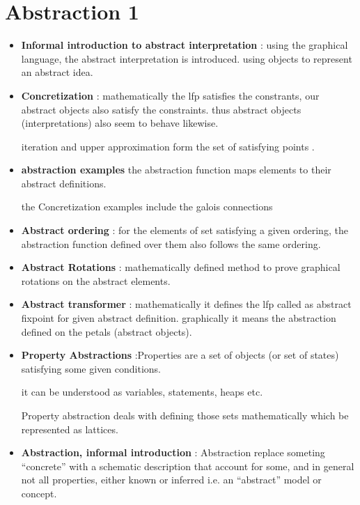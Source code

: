 \chapter{Abstraction 1}


\begin{itemize}
	\item{\textbf{Informal introduction to abstract interpretation} : using the graphical language, the abstract interpretation is introduced. using objects to represent an abstract idea.
	}

	\item{\textbf{Concretization} : mathematically the lfp satisfies the constrants, our abstract objects also satisfy the constraints. thus abstract objects (interpretations) also seem to behave likewise.

	iteration and upper approximation form the set of satisfying points . 
	}

	\item{\textbf{abstraction examples} the abstraction function maps elements to their abstract definitions. 

	the Concretization examples include the galois connections 
	}

	\item{\textbf{Abstract ordering} : for the elements of set satisfying a given ordering, the abstraction function defined over them also follows the same ordering.
	}

	\item{\textbf{Abstract Rotations} : mathematically defined method to prove graphical rotations on the abstract elements.
	}

	\item{\textbf{Abstract transformer} : mathematically it defines the lfp called as abstract fixpoint for given abstract definition. graphically it means the abstraction defined on the petals (abstract objects).
	}

	\item{\textbf{Property Abstractions} :Properties are a set of objects (or set of states) satisfying some given conditions.

	it can be understood as variables, statements, heaps etc.

	Property abstraction deals with defining those sets mathematically  which be represented as lattices.
	}

	\item{\textbf{Abstraction, informal introduction} : Abstraction replace someting “concrete” with a schematic description that account for some, and in general not all properties, either known or inferred i.e.  an “abstract” model or concept.

}
\end{itemize}
